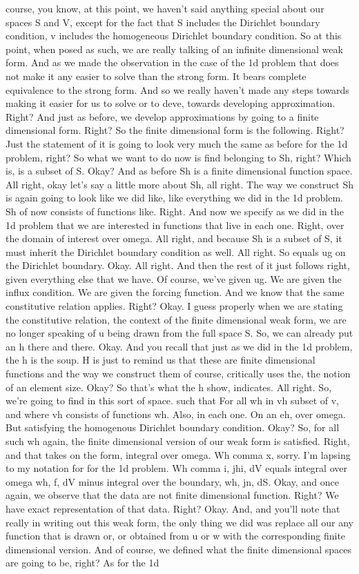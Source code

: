 \documentclass[10pt]{article}
\begin{document}
course, you know, at this point, we haven't said anything special about our spaces S and V, except for the fact that S includes the Dirichlet boundary condition, v includes the homogeneous Dirichlet boundary condition. So at this point, when posed as such, we are really talking of an infinite dimensional weak form. And as we made the observation in the case of the 1d problem that does not make it any easier to solve than the strong form. It bears complete equivalence to the strong form. And so we really haven't made any steps towards making it easier for us to solve or to deve, towards developing approximation. Right? And just as before, we develop approximations by going to a finite dimensional form. Right? So the finite dimensional form is the following. Right? Just the statement of it is going to look very much the same as before for the 1d problem, right? So what we want to do now is find belonging to Sh, right? Which is, is a subset of S. Okay? And as before Sh is a finite dimensional function space. All right, okay let's say a little more about Sh, all right. The way we construct Sh is again going to look like we did like, like everything we did in the 1d problem. Sh of now consists of functions like. Right. And now we specify as we did in the 1d problem that we are interested in functions that live in each one. Right, over the domain of interest over omega. All right, and because Sh is a subset of S, it must inherit the Dirichlet boundary condition as well. All right. So equals ug on the Dirichlet boundary. Okay. All right. And then the rest of it just follows right, given everything else that we have. Of course, we've given ug. We are given the influx condition. We are given the forcing function. And we know that the same constitutive relation applies. Right? Okay. I guess properly when we are stating the constitutive relation, the context of the finite dimensional weak form, we are no longer speaking of u being drawn from the full space S. So, we can already put an h there and there. Okay. And you recall that just as we did in the 1d problem, the h is the soup. H is just to remind us that these are finite dimensional functions and the way we construct them of course, critically uses the, the notion of an element size. Okay? So that's what the h show, indicates. All right. So, we're going to find in this sort of space. such that For all wh in vh subset of v, and where vh consists of functions wh. Also, in each one. On an eh, over omega. But satisfying the homogenous Dirichlet boundary condition. Okay? So, for all such wh again, the finite dimensional version of our weak form is satisfied. Right, and that takes on the form, integral over omega. Wh comma x, sorry. I'm lapsing to my notation for for the 1d problem. Wh comma i, jhi, dV equals integral over omega wh, f, dV minus integral over the boundary, wh, jn, dS. Okay, and once again, we observe that the data are not finite dimensional function. Right? We have exact representation of that data. Right? Okay. And, and you'll note that really in writing out this weak form, the only thing we did was replace all our any function that is drawn or, or obtained from u or w with the corresponding finite dimensional version. And of course, we defined what the finite dimensional spaces are going to be, right? As for the 1d 
\end{document}

